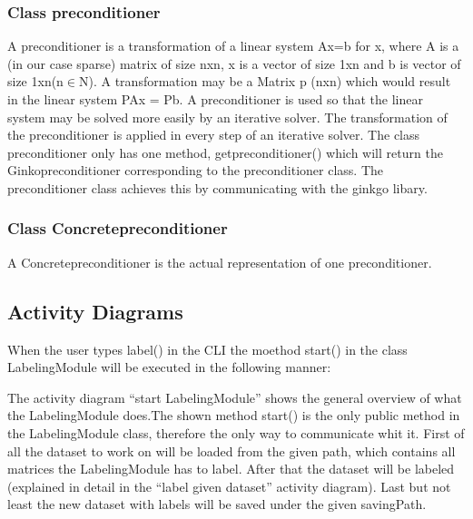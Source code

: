 \documentclass[parskip=full]{scrartcl}
\begin{document}
\subsubsection{Class \gls{preconditioner}}
A \gls{preconditioner} is a transformation of a linear system Ax=b for x, where A is a (in our case sparse) matrix of size nxn, x is a vector of size 1xn and b is vector of size 1xn(n$\in$N). A transformation may be a Matrix p (nxn) which would result in the linear system PAx = Pb. A \gls{preconditioner} is used so that the linear system may be solved more easily by an \gls{iterative solver}. The transformation of the \gls{preconditioner} is applied in every step of an \gls{iterative solver}. \newline\newline
The class \gls{preconditioner} only has one method, get\gls{preconditioner}() which will return the Ginko\gls{preconditioner} corresponding to the \gls{preconditioner} class. The \gls{preconditioner} class achieves this by communicating with the ginkgo libary.

\subsubsection{Class Concrete\gls{preconditioner}}
A Concrete\gls{preconditioner} is the actual representation of one \gls{preconditioner}.

\newpage
\subsection{Activity Diagrams}
When the user types label() in the CLI the moethod start() in the class LabelingModule will be executed in the following manner:

\begin{figure}[h]
\begin{center}

\label{Activity Diagrams}
\end{center}
\end{figure}
\newpage


The activity diagram ``start LabelingModule'' shows the general overview of what the LabelingModule does.The shown method start() is the only public method in the LabelingModule class, therefore the only way to communicate whit it.
First of all the dataset to work on will be loaded from the given path, which contains all matrices the LabelingModule has to label.
After that the dataset will be labeled (explained in detail in the ``label given dataset'' activity diagram).
Last but not least the new dataset with \glspl{label} will be saved under the given savingPath.
\end{document}
